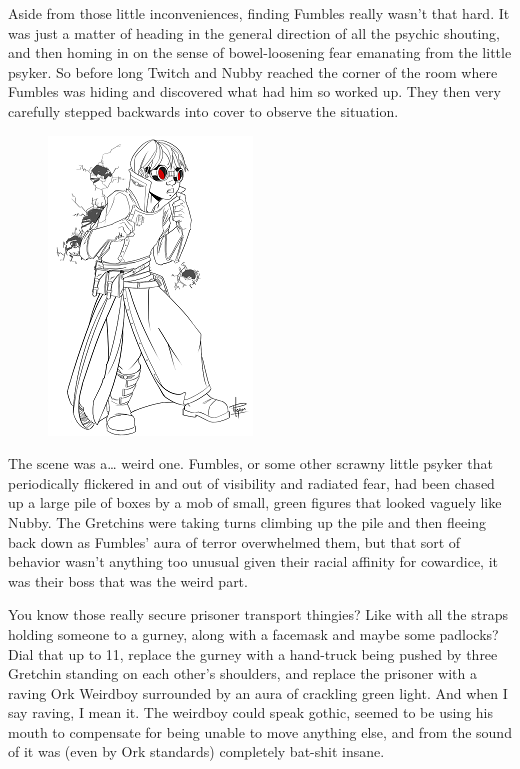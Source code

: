 Aside from those little inconveniences, finding Fumbles really wasn't that hard. 
It was just a matter of heading in the general direction of all the psychic shouting, and then homing in on the sense of bowel-loosening fear emanating from the little psyker. 
So before long Twitch and Nubby reached the corner of the room where Fumbles was hiding and discovered what had him so worked up. 
They then very carefully stepped backwards into cover to observe the situation.

\begin{figure}
	\begin{center}
		\includegraphics[width=\figwidth]{pics/16/30.png}
	\end{center}
\end{figure}
The scene was a… weird one. 
Fumbles, or some other scrawny little psyker that periodically flickered in and out of visibility and radiated fear, had been chased up a large pile of boxes by a mob of small, green figures that looked vaguely like Nubby. 
The Gretchins were taking turns climbing up the pile and then fleeing back down as Fumbles' aura of terror overwhelmed them, but that sort of behavior wasn't anything too unusual given their racial affinity for cowardice, it was their boss that was the weird part.

You know those really secure prisoner transport thingies? 
Like with all the straps holding someone to a gurney, along with a facemask and maybe some padlocks? 
Dial that up to 11, replace the gurney with a hand-truck being pushed by three Gretchin standing on each other's shoulders, and replace the prisoner with a raving Ork Weirdboy surrounded by an aura of crackling green light. 
And when I say raving, I mean it. 
The weirdboy could speak gothic, seemed to be using his mouth to compensate for being unable to move anything else, and from the sound of it was (even by Ork standards) completely bat-shit insane. 


